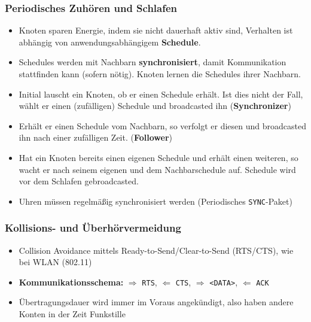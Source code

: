 \documentclass{article} %
\begin{document}
\subsubsection{Periodisches Zuhören und Schlafen}
\begin{itemize}
	\item Knoten sparen Energie, indem sie nicht dauerhaft aktiv sind, Verhalten ist abhängig von anwendungsabhängigem \textbf{Schedule}.
	\item Schedules werden mit Nachbarn \textbf{synchronisiert}, damit Kommunikation stattfinden kann (sofern nötig).
	Knoten lernen die Schedules ihrer Nachbarn.
	\item Initial lauscht ein Knoten, ob er einen Schedule erhält.
	Ist dies nicht der Fall, wählt er einen (zufälligen) Schedule und broadcasted ihn (\textbf{Synchronizer})
	\item Erhält er einen Schedule vom Nachbarn, so verfolgt er diesen und broadcasted ihn nach einer zufälligen Zeit. (\textbf{Follower})
	\item Hat ein Knoten bereits einen eigenen Schedule und erhält einen weiteren, so wacht er nach seinem eigenen und dem Nachbarschedule auf.
	Schedule wird vor dem Schlafen gebroadcasted.
	\item Uhren müssen regelmäßig synchronisiert werden (Periodisches \texttt{SYNC}-Paket)
\end{itemize}
\subsubsection{Kollisions- und Überhörvermeidung}
\begin{itemize}
	\item Collision Avoidance mittels Ready-to-Send/Clear-to-Send (RTS/CTS), wie bei WLAN (802.11)
	\item \textbf{Kommunikationsschema:} $\Rightarrow$ \texttt{RTS}, $\Leftarrow$ \texttt{CTS}, $\Rightarrow$ \texttt{<DATA>}, $\Leftarrow$ \texttt{ACK}
	\item Übertragungsdauer wird immer im Voraus angekündigt, also haben andere Konten in der Zeit Funkstille
\end{itemize}
\end{document}
